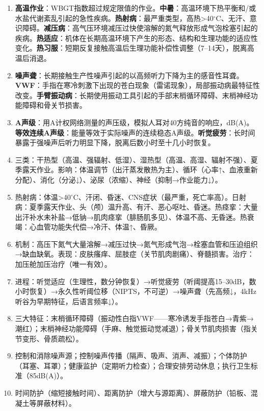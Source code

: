 \begin{enumerate}[leftmargin=*, itemsep=5pt]
    \item \textbf{高温作业}：WBGT指数超过规定限值的作业。\textbf{中暑}：高温环境下热平衡和/或水盐代谢紊乱引起的急性疾病。\textbf{热射病}：最严重类型，高热>40$^\circ$C、无汗、意识障碍。\textbf{减压病}：高气压环境减压过快使溶解的氮气释放形成气泡栓塞引起的疾病。\textbf{热适应}：机体在长期高温环境下产生的形态、结构和生理功能的适应性变化。\textbf{热习服}：短期反复接触高温后生理功能补偿性调整（7--14天），脱离高温后消退。
    \item \textbf{噪声聋}：长期接触生产性噪声引起的以高频听力下降为主的感音性耳聋。\textbf{VWF}：手指在寒冷刺激下出现的苍白现象（雷诺现象），局部振动病最特征性改变。\textbf{手臂振动病}：长期使用振动工具引起的手部末梢循环障碍、末梢神经功能障碍和骨关节损害。
    \item \textbf{A声级}：用A计权网络测量的声压级，模拟人耳对40方纯音的响应，dB(A)。\textbf{等效连续A声级}：能量等效于实际噪声的连续稳态A声级。\textbf{听觉疲劳}：长时间暴露于强噪声后听力明显下降，脱离后数小时至十几小时恢复。
    \item 三类：干热型（高温、强辐射、低湿）、湿热型（高温、高湿、辐射不强）、夏季露天作业。影响：体温调节（出汗蒸发散热为主）、循环（心率↑、血液重新分配）、消化（分泌↓）、泌尿（浓缩）、神经（抑制→作业能力↓）。
    \item 热射病：体温>40$^\circ$C、汗闭、昏迷、CNS症状（最严重，死亡率高）。日射病：夏季露天作业、头（颅）温升高、有汗、恶心呕吐、昏迷。热痉挛：大量出汗补水未补盐→低钠→肌肉痉挛（腓肠肌多见）、体温不高、无昏迷。热衰竭：心血管功能失代偿→冷汗、体温↑、昏厥。
    \item 机制：高压下氮气大量溶解→减压过快→氮气形成气泡→栓塞血管和压迫组织→缺血缺氧。表现：皮肤瘙痒、屈肢症（关节肌肉剧痛）、脊髓损害。治疗：加压舱加压治疗（唯一有效）。
    \item 进程：听觉适应（生理性，数分钟恢复）→听觉疲劳（听阈提高15--30dB，数小时恢复）→永久性听阈位移（NIPTS，不可逆）→噪声聋（先高频↓，4kHz听谷为早期特征，后语言频率↓）。
    \item 三大特征：末梢循环障碍（振动性白指VWF——寒冷诱发手指苍白→青紫→潮红）；末梢神经功能障碍（手麻、触觉振动觉减退）；骨关节肌肉损害（指关节变形、骨质疏松）。
    \item 控制和消除噪声源；控制噪声传播（隔声、吸声、消声、减振）；个体防护（耳塞、耳罩）；健康监护（定期听力检查）；合理安排劳动休息；执行卫生标准（85dB(A)）。
    \item 时间防护（缩短接触时间）、距离防护（增大与源距离）、屏蔽防护（铅板、混凝土等屏蔽材料）。
\end{enumerate}

\newpage
\newpage